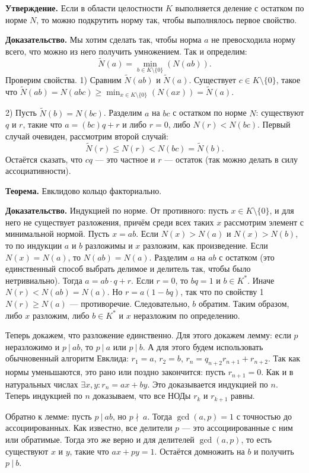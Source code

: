 \textbf{Утверждение.} Если в области целостности $K$ выполняется деление с остатком по норме $N$, то можно подкрутить норму так, чтобы выполнялось первое свойство.

\textbf{Доказательство.} Мы хотим сделать так, чтобы норма $a$ не превосходила норму всего, что можно из него получить умножением.
Так и определим:
\[
    \tilde N(a) = \min_{b \in K \setminus \{0\}}(N(ab)).
\]
Проверим свойства. 1) Сравним $\tilde N(ab)$ и $\tilde N(a)$.
Существует $c \in K \setminus \{0\}$, такое что $\tilde N(ab) = N(abc) \ge \min_{x \in K \setminus \{0\}}(N(ax)) = \tilde N(a)$.

2) Пусть $\tilde N(b) = N(bc)$.
Разделим $a$ на $bc$ с остатком по норме $N$: существуют $q$ и $r$, такие что $a = (bc)q + r$ и либо $r = 0$, либо $N(r) < N(bc)$.
Первый случай очевиден, рассмотрим второй случай:
\[
    \tilde N(r) \le N(r) < N(bc) = \tilde N(b).
\]
Остаётся сказать, что $cq$ --- это частное и $r$ --- остаток (так можно делать в силу ассоциативности).

\QED

\textbf{Теорема.} Евклидово кольцо факториально.

\textbf{Доказательство.} Индукцией по норме.
От противного: пусть $x \in K \setminus \{0\}$, и для него не существует разложения, причём среди всех таких $x$ рассмотрим элемент с минимальной нормой.
Пусть $x = ab$. Если $N(x) > N(a)$ и $N(x) > N(b)$, то по индукции $a$ и $b$ разложимы и $x$ разложим, как произведение.
Если $N(x) = N(a)$, то $N(ab) = N(a)$.
Разделим $a$ на $ab$ с остатком (это единственный способ выбрать делимое и делитель так, чтобы было нетривиально).
Тогда $a = ab \cdot q + r$.
Если $r = 0$, то $bq = 1$ и $b \in K^*$.
Иначе $N(r) < N(ab) = N(a)$.
Но $r = a(1 - bq)$, так что по свойству 1 $N(r) \ge N(a)$ --- противоречие.
Следовательно, $b$ обратим.
Таким образом, либо $x$ разложим, либо $b \in K^*$ и $x$ неразложим по определению.

Теперь докажем, что разложение единственно.
Для этого докажем лемму: если $p$ неразложимо и $p~|~ab$, то $p~|~a$ или $p~|~b$.
А для этого будем использовать обычновенный алгоритм Евклида: $r_1 = a$, $r_2 = b$, $r_n = q_{n+2} r_{n+1} + r_{n+2}$.
Так как нормы уменьшаются, это рано или поздно закончится: пусть $r_{n+1} = 0$.
Как и в натуральных числах $\exists x, y: r_n = ax + by$. Это доказывается индукцией по $n$.
Теперь индукцией по $n$ доказываем, что все НОДы $r_k$ и $r_{k+1}$ равны.

Обратно к лемме: пусть $p~|~ab$, но $p\nmid~a$.
Тогда $\gcd(a, p) = 1$ с точностью до ассоциированных.
Как известно, все делители $p$ --- это ассоциированные с ним или обратимые.
Тогда это же верно и для делителей $\gcd(a, p)$, то есть существуют $x$ и $y$, такие что $ax + py = 1$.
Остаётся домножить на $b$ и получить $p~|~b$.

